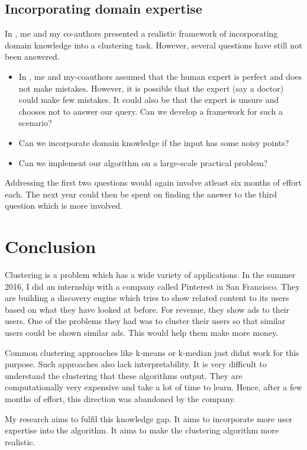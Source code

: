 \documentclass[11pt]{article}
\begin{document}
\subsection{Incorporating domain expertise}
In \cite{ashtiani2016clustering},  me and my co-authors presented a realistic framework of incorporating domain knowledge into a clustering task.  However, several questions have still not been answered.
\begin{itemize}
\item In \cite{ashtiani2016clustering}, me and my-coauthors assumed that the human expert is perfect and does not make mistakes. However, it is possible that the expert (say a doctor) could make few mistakes. It could also be that the expert is unsure and chooses not to answer our query. Can we develop a framework for such a scenario?
\item Can we incorporate domain knowledge if the input has some noisy points?
\item  Can we implement our algorithm on a large-scale practical problem?
\end{itemize}
Addressing the first two questions would again involve atleast six months of effort each. The next year could then be spent on finding the answer to the third question which is more involved. 

\section{Conclusion}
Clustering is a problem which has a wide variety of applications. In the summer 2016, I did an internship with a company called Pinterest in San Francisco. They are building a discovery engine which tries to show related content to its users based on what they have looked at before. For revenue, they show ads to their users. One of the problems they had was to cluster their users so that similar users could be shown similar ads. This would help them make more money.

Common clustering approaches like  k-means or k-median just didnt work for this purpose. Such approaches also lack interpretability. It is very difficult to understand the clustering that these algorithms output. They are computationally very expensive and take a lot of time to learn. Hence, after a few months of effort, this direction was abandoned by the company.

My research aims to fulfil this knowledge gap. It aims to incorporate more user expertise into the algorithm. It aims to make the clustering algorithm more realistic. 


 
\end{document}
